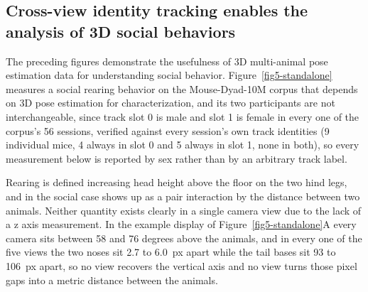 \documentclass[11pt]{article}
\begin{document}
\subsection{Cross-view identity tracking enables the analysis of 3D social behaviors}\label{subsec2-5-standalone}

The preceding figures demonstrate the usefulness of 3D multi-animal pose estimation data for understanding social behavior. Figure~\ref{fig5-standalone} measures a social rearing behavior on the Mouse-Dyad-10M corpus that depends on 3D pose estimation for characterization, and its two participants are not interchangeable, since track slot 0 is male and slot 1 is female in every one of the corpus's 56 sessions, verified against every session's own track identities (9 individual mice, 4 always in slot 0 and 5 always in slot 1, none in both), so every measurement below is reported by sex rather than by an arbitrary track label.

Rearing is defined increasing head height above the floor on the two hind legs, and in the social case shows up as a pair interaction by the distance between two animals. Neither quantity exists clearly in a single camera view due to the lack of a z axis measurement. In the example display of Figure~\ref{fig5-standalone}A every camera sits between 58 and 76 degrees above the animals, and in every one of the five views the two noses sit 2.7 to 6.0~px apart while the tail bases sit 93 to 106~px apart, so no view recovers the vertical axis and no view turns those pixel gaps into a metric distance between the animals.
\end{document}
